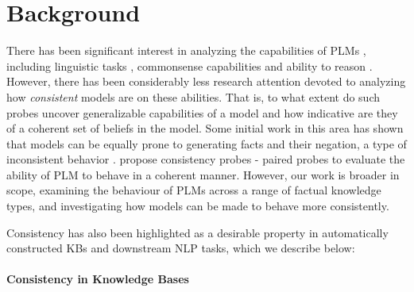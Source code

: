 







\section{Background}
\label{sec:background}

There has been significant interest in analyzing the capabilities of PLMs \cite{rogers2020primer}, including linguistic tasks \cite{yoav-syntax,hewitt2019structural,tenney2019bert,amnesic_probing}, commonsense capabilities \cite{forbes2019neural, da2019cracking,zhang2020language} and ability to reason \cite{talmor2019olmpics, kassner-etal-2020-pretrained}. However, there has been considerably less research attention devoted to analyzing how \emph{consistent} models are on these abilities. That is, to what extent do such probes uncover generalizable capabilities of a model and how indicative are they of a coherent set of beliefs in the model. Some initial work in this area has shown that models can be equally prone to generating facts and their negation, a type of inconsistent behavior \cite{Ettinger_2020,kassner-schutze-2020-negated}.  propose consistency probes - paired probes to evaluate the ability of PLM to behave in a coherent manner. However, our work is broader in scope, examining the behaviour of PLMs across a range of factual knowledge types, and investigating how models can be made to behave more consistently. 

Consistency has also been highlighted as a desirable property in automatically constructed KBs and downstream NLP tasks, which we describe below:

\paragraph{Consistency in Knowledge Bases}


